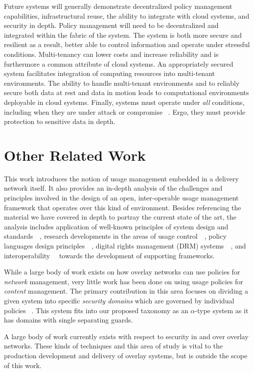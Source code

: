 Future systems will generally demonstrate decentralized policy management capabilities, infrastructural reuse, the ability to integrate with cloud systems, and security in depth.  Policy management will need to be decentralized and integrated within the fabric of the system.  The system is both more secure and resilient as a result, better able to control information and operate under stressful conditions.  Multi-tenancy can lower costs and increase reliability and is furthermore a common attribute of cloud systems.  An appropriately secured system facilitates integration of computing resources into multi-tenant environments.  The ability to handle multi-tenant environments and to reliably secure both data at rest and data in motion leads to computational environments deployable in cloud systems.  Finally, systems must operate under \textit{all} conditions, including when they are under attack or compromise ~\cite{proposal:ron-ross}.  Ergo, they must provide protection to sensitive data in depth.

\section{Other Related Work}
This work introduces the notion of usage management embedded in a delivery network itself.  It also provides an in-depth analysis of the challenges and principles involved in the design of an open, inter-operable usage management framework that operates over this kind of environment. Besides referencing the material we have covered in depth to portray the current state of the art, the analysis includes application of well-known principles of system design and standards~~\cite{BlCl:01,Cl:88,ClWrSoBr:02}, research developments in the areas of usage control~~\cite{PaSa:04,JaHeLa:10}, policy languages design principles~~\cite{JaHeMa:06}, digital rights management (DRM) systems~~\cite{JaHe:09},  and interoperability~~\cite{JaHe:04,HeJa:05,KoLaMaMi:04,coral,marlin} towards the development of supporting frameworks.

While a large body of work exists on how overlay networks can use policies for \textit{network} management, very little work has been done on using usage policies for \textit{content} management.  The primary contribution in this area focuses on dividing a given system into specific \textit{security domains} which are governed by individual policies ~\cite{4457175}.  This system fits into our proposed taxonomy as an $\alpha$-type system as it has domains with single separating guards.

A large body of work currently exists with respect to security in and over overlay networks.  These kinds of techniques and this area of study is vital to the production development and delivery of overlay systems, but is outside the scope of this work.